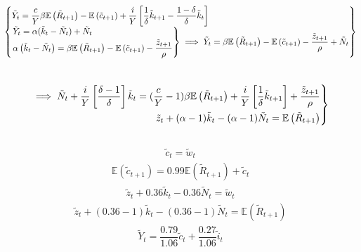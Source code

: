 \documentclass[12pt]{extarticle}
\newcommand{\expec}[1]{\mathbb{E}\left(#1\right)}
\begin{document}
$$\begin{Bmatrix}
    \tilde Y_t = \dfrac{c}{Y} \beta\expec{\tilde R_{t+1}}-\expec{\tilde{c}_{t+1}}+ \dfrac{i}{Y} \left[\dfrac{1}{\delta}\tilde{k}_{t+1}-\dfrac{1-\delta}{\delta}\tilde{k}_t\right] \hfill\\
    \begin{rcases}
        \tilde{Y}_t=\alpha (\tilde{k}_t - \tilde{N}_t) +  \tilde{N}_t\\
        \alpha \left(\tilde{k}_t - \tilde{N}_t\right)=\beta\expec{\tilde R_{t+1}}-\expec{\tilde{c}_{t+1}} - \dfrac{\tilde{z}_{t+1}}{\rho}
    \end{rcases} \implies \tilde{Y}_t=\beta\expec{\tilde R_{t+1}}-\expec{\tilde{c}_{t+1}} - \dfrac{\tilde{z}_{t+1}}{\rho} +  \tilde{N}_t
\end{Bmatrix}$$\\
$$\begin{rcases}
    \implies    \tilde{N}_t + \dfrac{i}{Y} \left[\dfrac{\delta-1}{\delta}\right]\tilde{k}_t= (\dfrac{c}{Y} -1) \beta\expec{\tilde R_{t+1}} + \dfrac{i}{Y} \left[\dfrac{1}{\delta}\tilde{k}_{t+1}\right]+ \dfrac{\tilde{z}_{t+1}}{\rho}\\
    \hfill \tilde{z}_t+(\alpha-1) \tilde{k}_t -(\alpha-1) \tilde{N}_t=\expec{\tilde{R}_{t+1}} 
\end{rcases}$$\\
\setcounter{equation}{0}
\renewcommand{\theequation}{\arabic{equation}}
\setcounter{equation}{0}
\renewcommand{\theequation}{\roman{equation}}
\begin{align}
    \tilde{c}_t=\tilde{w}_t
\end{align}
\begin{align}
    \expec{\tilde{c}_{t+1}}=0.99\expec{\tilde R_{t+1}}+\tilde{c}_t
\end{align}
\begin{align}
    \tilde{z}_t+ 0.36 \tilde{k}_t - 0.36 \tilde{N}_t=\tilde{w}_t
\end{align}
\begin{align}
    \tilde{z}_t+(0.36-1) \tilde{k}_t -(0.36-1) \tilde{N}_t=\expec{\tilde{R}_{t+1}}
\end{align}
\begin{align}
    \tilde Y_t = \dfrac{0.79}{1.06} \tilde{c}_t+ \dfrac{0.27}{1.06} \tilde{i}_t
\end{align}
\end{document}
